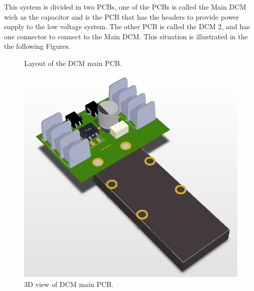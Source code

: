 This system is divided in two PCBs, one of the PCBs is called the Main DCM wich as the capacitor and is the PCB that has the headers to provide power supply to the low voltage system. The other PCB is called the DCM 2, and has one connector to connect to the Main DCM. This situation is illustrated in the the following Figures.
\begin{figure}[!htb]
\centering
  \begin{subfigmatrix}{2}
  \end{subfigmatrix}
  \caption{Layout of the DCM main PCB.}
  \label{fig:DCM1Layout}
\end{figure}

\begin{figure}[!htb]
	\centering
	\includegraphics[width=0.5\linewidth]{Figures/3D_Layout_Front.PNG}
	\caption{3D view of DCM main PCB.}
	\label{fig:DCM1Layout3D}
\end{figure}


